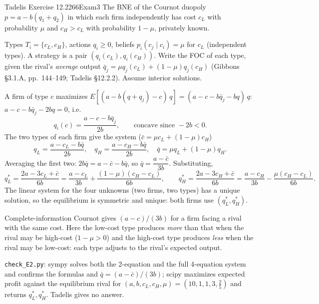 \begin{exsol}{Tadelis Exercise 12.2}{266}{Exam}{3}
\asked The BNE of the Cournot duopoly $p=a-b(q_1+q_2)$ in which each firm independently has cost
$c_L$ with probability $\mu$ and $c_H>c_L$ with probability $1-\mu$, privately known.

\method Types $T_i=\{c_L,c_H\}$, actions $q_i\ge0$, beliefs $p_i(c_j\mid c_i)=\mu$ for $c_L$ (independent
types). A strategy is a pair $(q_i(c_L),q_i(c_H))$. Write the FOC of each type, given the rival's
\emph{average} output $\bar q_j=\mu q_j(c_L)+(1-\mu)q_j(c_H)$ (Gibbons \S3.1.A, pp.~144--149;
Tadelis \S12.2.2). Assume interior solutions.

\solution
A firm of type $c$ maximizes $E[(a-b(q+q_j)-c)\,q]=(a-c-b\bar q_j-bq)\,q$:
$a-c-b\bar q_j-2bq=0$, i.e.
\[
  q_i(c)=\frac{a-c-b\bar q_j}{2b},\qquad \text{concave since } -2b<0 .
\]
The two types of each firm give the system ($\bar c=\mu c_L+(1-\mu)c_H$)
\[
  q_L=\frac{a-c_L-b\bar q}{2b},\quad q_H=\frac{a-c_H-b\bar q}{2b},\quad
  \bar q=\mu q_L+(1-\mu)q_H .
\]
Averaging the first two: $2b\bar q=a-\bar c-b\bar q$, so $\bar q=\dfrac{a-\bar c}{3b}$. Substituting,
\[
  q_L^*=\frac{2a-3c_L+\bar c}{6b}=\frac{a-c_L}{3b}+\frac{(1-\mu)(c_H-c_L)}{6b},\qquad
  q_H^*=\frac{2a-3c_H+\bar c}{6b}=\frac{a-c_H}{3b}-\frac{\mu(c_H-c_L)}{6b}.
\]
The linear system for the four unknowns (two firms, two types) has a unique solution, so
the equilibrium is symmetric and unique: both firms use $(q_L^*,q_H^*)$.

\interp Complete-information Cournot gives $(a-c)/(3b)$ for a firm facing a rival with the same
cost. Here the low-cost type produces \emph{more} than that when the rival may be high-cost
($1-\mu>0$) and the high-cost type produces \emph{less} when the rival may be low-cost: each type
adjusts to the rival's expected output.

\verify \texttt{check\_E2.py}: sympy solves both the 2-equation and the full 4-equation system
and confirms the formulas and $\bar q=(a-\bar c)/(3b)$; scipy maximizes expected profit against
the equilibrium rival for $(a,b,c_L,c_H,\mu)=(10,1,1,3,\tfrac25)$ and returns $q_L^*,q_H^*$.
Tadelis gives no answer.

\end{exsol}
